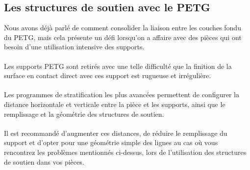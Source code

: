 \documentclass[11pt,a4paper]{article}
\begin{document}
	\subsection{Les structures de soutien avec le PETG}Nous avons déjà parlé de comment consolider la liaison entre les couches fondu du PETG, mais cela présente un défi  lorsqu’on a affaire avec des pièces qui ont besoin d’une utilisation intensive des supports.
\\\\
Les supports PETG sont retirés avec une telle difficulté que la finition de la surface en contact direct avec ces support est rugueuse et irrégulière.
\\\\
Les programmes de stratification les plus avancées  permettent de configurer la distance horizontale et verticale entre la pièce et les supports, ainsi que le remplissage et la géométrie des structures de soutien.
\\\\
Il est recommandé d’augmenter ces distances, de réduire le remplissage du support et d’opter pour une géométrie simple des lignes au cas où vous rencontrez les problèmes mentionnés ci-dessus, lors de l’utilisation des structures de soutien dans vos pièces.
\end{document}
